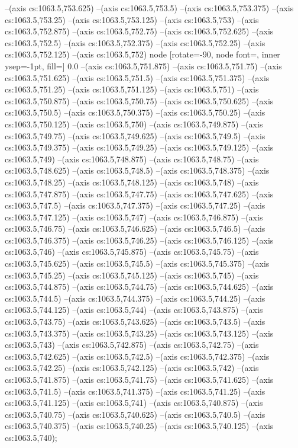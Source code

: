 --(axis cs:1063.5,753.625)
--(axis cs:1063.5,753.5)
--(axis cs:1063.5,753.375)
--(axis cs:1063.5,753.25)
--(axis cs:1063.5,753.125)
--(axis cs:1063.5,753)
--(axis cs:1063.5,752.875)
--(axis cs:1063.5,752.75)
--(axis cs:1063.5,752.625)
--(axis cs:1063.5,752.5)
--(axis cs:1063.5,752.375)
--(axis cs:1063.5,752.25)
--(axis cs:1063.5,752.125)
--(axis cs:1063.5,752)
node [rotate=-90, node font=\tiny, inner ysep=-1pt, fill=\bgcol] {0.0}
--(axis cs:1063.5,751.875)
--(axis cs:1063.5,751.75)
--(axis cs:1063.5,751.625)
--(axis cs:1063.5,751.5)
--(axis cs:1063.5,751.375)
--(axis cs:1063.5,751.25)
--(axis cs:1063.5,751.125)
--(axis cs:1063.5,751)
--(axis cs:1063.5,750.875)
--(axis cs:1063.5,750.75)
--(axis cs:1063.5,750.625)
--(axis cs:1063.5,750.5)
--(axis cs:1063.5,750.375)
--(axis cs:1063.5,750.25)
--(axis cs:1063.5,750.125)
--(axis cs:1063.5,750)
--(axis cs:1063.5,749.875)
--(axis cs:1063.5,749.75)
--(axis cs:1063.5,749.625)
--(axis cs:1063.5,749.5)
--(axis cs:1063.5,749.375)
--(axis cs:1063.5,749.25)
--(axis cs:1063.5,749.125)
--(axis cs:1063.5,749)
--(axis cs:1063.5,748.875)
--(axis cs:1063.5,748.75)
--(axis cs:1063.5,748.625)
--(axis cs:1063.5,748.5)
--(axis cs:1063.5,748.375)
--(axis cs:1063.5,748.25)
--(axis cs:1063.5,748.125)
--(axis cs:1063.5,748)
--(axis cs:1063.5,747.875)
--(axis cs:1063.5,747.75)
--(axis cs:1063.5,747.625)
--(axis cs:1063.5,747.5)
--(axis cs:1063.5,747.375)
--(axis cs:1063.5,747.25)
--(axis cs:1063.5,747.125)
--(axis cs:1063.5,747)
--(axis cs:1063.5,746.875)
--(axis cs:1063.5,746.75)
--(axis cs:1063.5,746.625)
--(axis cs:1063.5,746.5)
--(axis cs:1063.5,746.375)
--(axis cs:1063.5,746.25)
--(axis cs:1063.5,746.125)
--(axis cs:1063.5,746)
--(axis cs:1063.5,745.875)
--(axis cs:1063.5,745.75)
--(axis cs:1063.5,745.625)
--(axis cs:1063.5,745.5)
--(axis cs:1063.5,745.375)
--(axis cs:1063.5,745.25)
--(axis cs:1063.5,745.125)
--(axis cs:1063.5,745)
--(axis cs:1063.5,744.875)
--(axis cs:1063.5,744.75)
--(axis cs:1063.5,744.625)
--(axis cs:1063.5,744.5)
--(axis cs:1063.5,744.375)
--(axis cs:1063.5,744.25)
--(axis cs:1063.5,744.125)
--(axis cs:1063.5,744)
--(axis cs:1063.5,743.875)
--(axis cs:1063.5,743.75)
--(axis cs:1063.5,743.625)
--(axis cs:1063.5,743.5)
--(axis cs:1063.5,743.375)
--(axis cs:1063.5,743.25)
--(axis cs:1063.5,743.125)
--(axis cs:1063.5,743)
--(axis cs:1063.5,742.875)
--(axis cs:1063.5,742.75)
--(axis cs:1063.5,742.625)
--(axis cs:1063.5,742.5)
--(axis cs:1063.5,742.375)
--(axis cs:1063.5,742.25)
--(axis cs:1063.5,742.125)
--(axis cs:1063.5,742)
--(axis cs:1063.5,741.875)
--(axis cs:1063.5,741.75)
--(axis cs:1063.5,741.625)
--(axis cs:1063.5,741.5)
--(axis cs:1063.5,741.375)
--(axis cs:1063.5,741.25)
--(axis cs:1063.5,741.125)
--(axis cs:1063.5,741)
--(axis cs:1063.5,740.875)
--(axis cs:1063.5,740.75)
--(axis cs:1063.5,740.625)
--(axis cs:1063.5,740.5)
--(axis cs:1063.5,740.375)
--(axis cs:1063.5,740.25)
--(axis cs:1063.5,740.125)
--(axis cs:1063.5,740);

